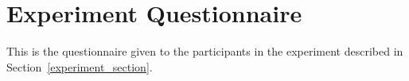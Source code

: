\chapter{Experiment Questionnaire \label{Experiment_pdf}}

This is the questionnaire given to the participants in the experiment described in Section~\ref{experiment_section}.


